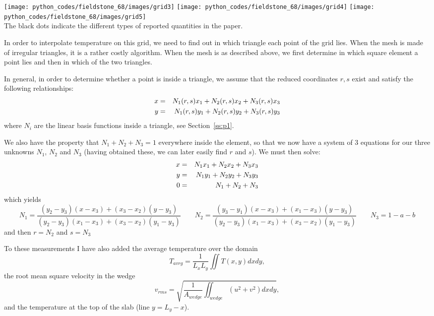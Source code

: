 \begin{center}
\texttt{[image: python\_codes/fieldstone\_68/images/grid3]}
\texttt{[image: python\_codes/fieldstone\_68/images/grid4]}
\texttt{[image: python\_codes/fieldstone\_68/images/grid5]}\\
{\captionfont The black dots indicate the different types of reported quantities in the paper.}
\end{center}


In order to interpolate temperature on this grid, we need to find out in which 
triangle each point of the grid lies. When the mesh is made of irregular triangles, 
it is a rather costly algorithm. When the mesh is as described above, we first 
determine in which square element  a point lies and then in which of the 
two triangles. 

In general, in order to determine whether a point is inside a triangle, we assume that 
the reduced coordinates $r,s$ exist and satisfy the following 
relationships:
\begin{eqnarray}
x &=& N_1(r,s) x_1 + N_2(r,s) x_2 + N_3(r,s) x_3 \nonumber\\  
y &=& N_1(r,s) y_1 + N_2(r,s) y_2 + N_3(r,s) y_3 \nonumber
\end{eqnarray}
where $N_i$ are the linear basis functions inside a triangle, see Section~\ref{ss:p1}.

We also have the property that $N_1+N_2+N_3=1$ everywhere inside the element, so that 
we now have a system of 3 equations for our three unknowns $N_1$, $N_2$ and $N_3$ (having
obtained these, we can later easily find $r$ and $s$).
We must then solve:
\begin{eqnarray}
x &=& N_1 x_1 + N_2 x_2 + N_3 x_3 \nonumber\\  
y &=& N_1 y_1 + N_2 y_2 + N_3 y_3 \nonumber\\
0 &=& N_1+N_2+N_3 \nonumber
\end{eqnarray}
which yields
\[
N_1=\frac{(y_2 - y_3)(x - x_3) + (x_3 - x_2)(y - y_3)}{(y_2 - y_3)(x_1 - x_3) + (x_3 - x_2)(y_1 - y_3)}
\qquad
N_2=\frac{(y_3 - y_1)(x - x_3) + (x_1 - x_3)(y - y_3)}{(y_2 - y_3)(x_1 - x_3) + (x_3 - x_2)(y_1 - y_3)}
\qquad
N_3=1-a-b
\]
and then $r=N_2$ and $s=N_3$

To these measurements I have also added the average temperature over the domain 
\[
T_{avrg} = \frac{1}{L_xL_y}\iint T(x,y) dx dy,
\]
the root mean square velocity in the wedge
\[
v_{rms} = \sqrt{  \frac{1}{A_{wedge}} \iint_{wedge} (u^2+v^2) dx dy    },
\]
and the temperature at the top of the slab (line $y=L_y-x$).



